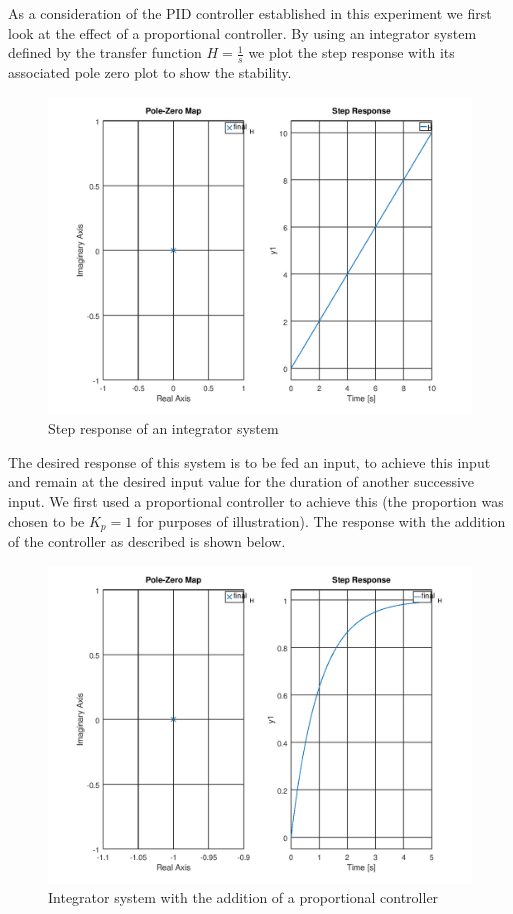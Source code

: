\documentclass[a4paper, 12pt]{article}
\begin{document}
As a consideration of the PID controller established in this experiment we first look at the effect of a proportional controller. By using an integrator system defined by the transfer function $H = \frac{1}{s}$ we plot the step response with its associated pole zero plot to show the stability.

\begin{figure}[H]
	\centering
	\includegraphics[width=\textwidth]{integrator_system.png}
	\caption{Step response of an integrator system}
	\label{fig:integrator_system}
\end{figure}

The desired response of this system is to be fed an input, to achieve this input and remain at the desired input value for the duration of another successive input. We first used a proportional controller to achieve this (the proportion was chosen to be $K_p = 1$ for purposes of illustration). The response with the addition of the controller as described is shown below.

\begin{figure}[H]
	\centering
	\includegraphics[width=\textwidth]{integrator_system_proportional_controller.png}
	\caption{Integrator system with the addition of a proportional controller}
	\label{fig:integrator_system_proportional_controller}
\end{figure}
\end{document}
